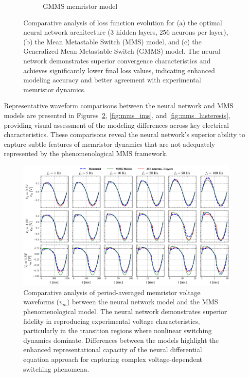 \documentclass[11pt, oneside]{article}
\begin{document}
\begin{figure}[htbp!]
\begin{subfigure}[c]{0.48\linewidth}
        \caption{GMMS memristor model}
    \end{subfigure}
    \caption{Comparative analysis of loss function evolution for (a) the optimal neural network architecture (3 hidden layers, 256 neurons per layer), (b) the Mean Metastable Switch (MMS) model, and (c) the Generalized Mean Metastable Switch (GMMS) model. The neural network demonstrates superior convergence characteristics and achieves significantly lower final loss values, indicating enhanced modeling accuracy and better agreement with experimental memristor dynamics.}
    \label{fig:comparison_mms}
\end{figure}

Representative waveform comparisons between the neural network and MMS models are presented in Figures~\ref{fig:mms_vms}, \ref{fig:mms_ims}, and \ref{fig:mms_histeresis}, providing visual assessment of the modeling differences across key electrical characteristics. These comparisons reveal the neural network's superior ability to capture subtle features of memristor dynamics that are not adequately represented by the phenomenological MMS framework.

\begin{figure}[htbp!]
    \centering
    \includegraphics[width=\linewidth]{mms_results/simulated_vms.pdf}
    \caption{Comparative analysis of period-averaged memristor voltage waveforms ($v_m$) between the neural network model and the MMS phenomenological model. The neural network demonstrates superior fidelity in reproducing experimental voltage characteristics, particularly in the transition regions where nonlinear switching dynamics dominate. Differences between the models highlight the enhanced representational capacity of the neural differential equation approach for capturing complex voltage-dependent switching phenomena.}
    \label{fig:mms_vms}
\end{figure}
\end{document}
